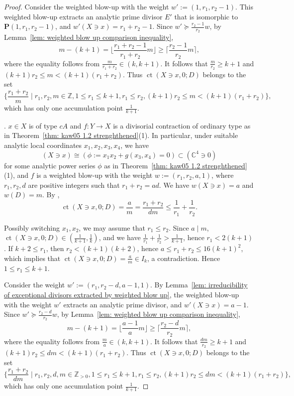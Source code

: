 \documentclass[11pt]{amsart}
\numberwithin{equation}{section}
\newcommand{\ct}{\operatorname{ct}}
\theoremstyle{definition}
\theoremstyle{definition}
\begin{document}
\begin{proof}
Consider the weighted blow-up with the weight $w':=(1,r_1,r_2-1)$. This weighted blow-up extracts an analytic prime divisor $E'$ that is isomorphic to $\mathbf{P}(1,r_1,r_2-1)$, and $w'(X\ni x)=r_1+r_2-1$. Since $w'\succeq \frac{r_2-1}{r_2}w$, by Lemma~\ref{lem: weighted blow up comparison inequality}, $$m-(k+1)=\lfloor\frac{r_1+r_2-1}{r_1+r_2}m\rfloor\geq \lceil\frac{r_2-1}{r_2}m\rceil,$$ where the equality follows from $\frac{m}{r_1+r_2}\in (k,k+1)$. It follows that $\frac{m}{r_2}\geq k+1$ and $(k+1)r_2\leq m< (k+1)(r_1+r_2)$. Thus $\ct(X\ni x,0;D)$ belongs to the set $$\{\frac{r_1+r_2}{m}\mid r_1,r_2,m\in \mathbb{Z}, 1\leq r_1\leq k+1, r_1\leq r_2, (k+1)r_2\leq m< (k+1)(r_1+r_2)\},$$ which has only one accumulation point $\frac{1}{k+1}$.

\medskip


. $x\in X$ is of type $cA$ and $f: Y\to X$ is a divisorial contraction of ordinary type as in Theorem~\ref{thm: kaw05 1.2 strenghthened}(1). In particular, under suitable analytic local coordinates $x_1,x_2,x_3,x_4$, we have $$(X\ni x)\cong (\phi:= x_1x_2+g(x_3,x_4)=0)\subset (\mathbb C^4\ni 0)$$ for some analytic power series $\phi$ as in Theorem~\ref{thm: kaw05 1.2 strenghthened}(1), and $f$ is a weighted blow-up with the weight $w:=(r_1,r_2,a,1)$, where $r_1,r_2,d$ are positive integers such that $r_1+r_2=ad$. We have $w(X\ni x)=a$ and $w(D)=m$. By \cite[Proposition 4.2]{Che19}, $$\ct(X\ni x,0;D)=\frac{a}{m}=\frac{r_1+r_2}{dm}\leq \frac{1}{r_1}+\frac{1}{r_2}.$$

Possibly switching $x_1,x_2$, we may assume that $r_1\leq r_2$. Since $a\mid m$, $\ct(X\ni x,0;D)\in (\frac{1}{k+1},\frac{1}{k})$, and we have $\frac{1}{r_1}+\frac{1}{r_2}>\frac{1}{k+1}$, hence $r_1<2(k+1)$. If $k+2\leq r_1$, then $r_2< (k+1)(k+2)$, hence $a\leq r_1+r_2\leq 16(k+1)^2$, which implies that $\ct(X\ni x,0;D)=\frac{a}{m}\in I_k$, a contradiction. Hence $1\leq r_1\leq k+1$.

Consider the weight $w':=(r_1,r_2-d,a-1,1)$. By Lemma~\ref{lem: irreducibility of exceptional divisors extracted by weighted blow up}, the weighted blow-up with the weight $w'$ extracts an analytic prime divisor, and $w'(X\ni x)=a-1$. Since $w'\succeq \frac{r_2-d}{r_2}w$, by Lemma~\ref{lem: weighted blow up comparison inequality}, $$m-(k+1)=\lfloor\frac{a-1}{a}m\rfloor\geq \lceil\frac{r_2-d}{r_2}m\rceil,$$ where the equality follows from $\frac{m}{a}\in (k,k+1)$. It follows that $\frac{dm}{r_2}\geq k+1$ and $(k+1)r_2\leq dm< (k+1)(r_1+r_2)$. Thus $\ct(X\ni x,0;D)$ belongs to the set $$\{\frac{r_1+r_2}{dm}\mid r_1,r_2,d,m\in \mathbb{Z}_{>0}, 1\leq r_1\leq k+1, r_1\leq r_2, (k+1)r_2\leq dm< (k+1)(r_1+r_2)\},$$ which has only one accumulation point $\frac{1}{k+1}$.
\end{proof}
\end{document}
